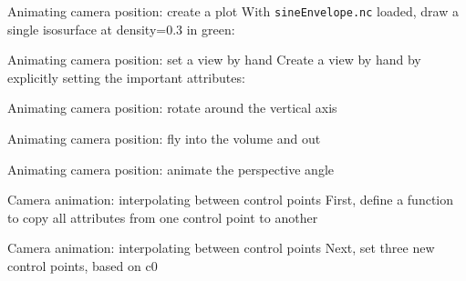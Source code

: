 \begin{frame}{Animating camera position: create a plot}
  With \texttt{sineEnvelope.nc} loaded, draw a single isosurface at density=0.3 in green:
  
    \pause
  
\end{frame}

\begin{frame}{Animating camera position: set a view by hand}
  Create a view by hand by explicitly setting the important attributes:
  
\end{frame}

\begin{frame}{Animating camera position: rotate around the vertical axis}
  
\end{frame}

\begin{frame}{Animating camera position: fly into the volume and out}
  
\end{frame}

\begin{frame}{Animating camera position: animate the perspective angle}
  
\end{frame}

\begin{frame}{Camera animation: interpolating between control points}
  First, define a function to copy all attributes from one control point to another
  
\end{frame}

\begin{frame}{Camera animation: interpolating between control points}
  Next, set three new control points, based on c0
  
\end{frame}

